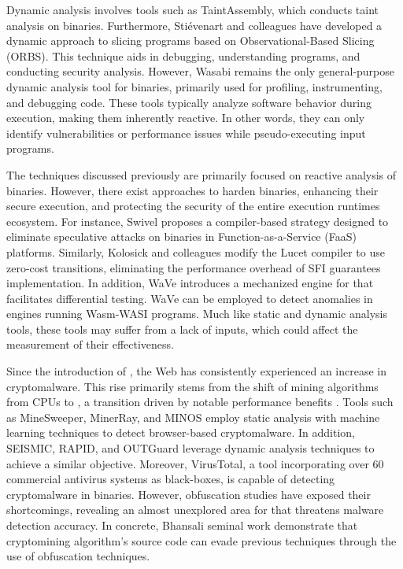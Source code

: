  Dynamic analysis involves tools such as TaintAssembly\cite{taintassembly}, which conducts taint analysis on \Wasm binaries. 
Furthermore, Stiévenart and colleagues have developed a dynamic approach to slicing \Wasm programs based on Observational-Based Slicing (ORBS)\cite{slicing, slicing2}.
This technique aids in debugging, understanding programs, and conducting security analysis.
However, Wasabi\cite{wasabi} remains the only general-purpose dynamic analysis tool for \Wasm binaries, primarily used for profiling, instrumenting, and debugging \Wasm code. 
These tools typically analyze software behavior during execution, making them inherently reactive. 
In other words, they can only identify vulnerabilities or performance issues while pseudo-executing input \Wasm programs.

The techniques discussed previously are primarily focused on reactive analysis of \Wasm binaries.
However, there exist approaches to harden \Wasm binaries, enhancing their secure execution, and protecting the security of the entire execution runtimes ecosystem. 
For instance, Swivel\cite{Swivel} proposes a compiler-based strategy designed to eliminate speculative attacks on \Wasm binaries in Function-as-a-Service (FaaS) platforms. 
Similarly, Kolosick and colleagues \cite{10.1145/3498688} modify the Lucet compiler to use zero-cost transitions, eliminating the performance overhead of SFI guarantees implementation.
In addition, WaVe\cite{wave} introduces a mechanized engine for \Wasm that facilitates differential testing. 
WaVe can be employed to detect anomalies in engines running Wasm-WASI programs. 
Much like static and dynamic analysis tools, these tools may suffer from a lack of \Wasm inputs, which could affect the measurement of their effectiveness.



 Since the introduction of \Wasm, the Web has consistently experienced an increase in cryptomalware. 
This rise primarily stems from the shift of mining algorithms from CPUs to \Wasm, a transition driven by notable performance benefits \cite{musch2019new}.
Tools such as MineSweeper\cite{Minesweeper}, MinerRay\cite{MinerRay}, and MINOS\cite{MINOS} employ static analysis with machine learning techniques to detect browser-based cryptomalware.
In addition, SEISMIC\cite{SEISMIC}, RAPID\cite{RAPID}, and OUTGuard\cite{Outguard} leverage dynamic analysis techniques to achieve a similar objective.
Moreover, VirusTotal, a tool incorporating over 60 commercial antivirus systems as black-boxes, is capable of detecting cryptomalware in \Wasm binaries.
However, obfuscation studies have exposed their shortcomings, revealing an almost unexplored area for \Wasm that threatens malware detection accuracy.
In concrete, Bhansali \etal seminal work\cite{10.1145/3507657.3528560} demonstrate that cryptomining algorithm's source code can evade previous techniques through the use of obfuscation techniques.



